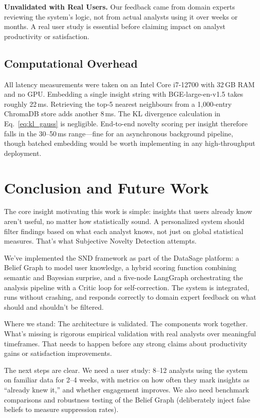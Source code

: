 \documentclass[conference]{IEEEtran}
\begin{document}
\textbf{Unvalidated with Real Users.} Our feedback came from domain
experts reviewing the system's logic, not from actual analysts using it
over weeks or months. A real user study is essential before claiming
impact on analyst productivity or satisfaction.

\subsection{Computational Overhead}

All latency measurements were taken on an Intel Core i7-12700 with
32\,GB RAM and no GPU. Embedding a single insight string with
BGE-large-en-v1.5 takes roughly 22\,ms. Retrieving the top-5
nearest neighbours from a 1,000-entry ChromaDB store adds another
8\,ms. The KL divergence calculation in Eq.~\eqref{eq:kl_gauss}
is negligible. End-to-end novelty scoring per insight therefore
falls in the 30--50\,ms range---fine for an asynchronous background
pipeline, though batched embedding would be worth implementing in
any high-throughput deployment.

\section{Conclusion and Future Work}
\label{sec:conclusion}

The core insight motivating this work is simple: insights that users
already know aren't useful, no matter how statistically sound. A
personalized system should filter findings based on what each analyst
knows, not just on global statistical measures. That's what Subjective
Novelty Detection attempts.

We've implemented the SND framework as part of the DataSage platform:
a Belief Graph to model user knowledge, a hybrid scoring function
combining semantic and Bayesian surprise, and a five-node LangGraph
orchestrating the analysis pipeline with a Critic loop for self-correction.
The system is integrated, runs without crashing, and responds correctly to
domain expert feedback on what should and shouldn't be filtered.

Where we stand: The architecture is validated. The components work
together. What's missing is rigorous empirical validation with real
analysts over meaningful timeframes. That needs to happen before any
strong claims about productivity gains or satisfaction improvements.

The next steps are clear. We need a user study: 8--12 analysts using the
system on familiar data for 2--4 weeks, with metrics on how often they
mark insights as ``already knew it,'' and whether engagement improves.
We also need benchmark comparisons and robustness testing of the Belief
Graph (deliberately inject false beliefs to measure suppression rates).
\end{document}
